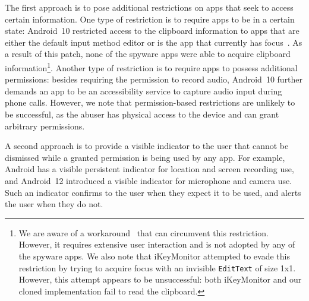 The first approach is to pose additional restrictions on apps that seek to access certain information. One type of restriction is to require apps to be in a certain state: Android~10 restricted access to the clipboard information
to apps that are either the default input
method editor or is the app that currently has focus~\cite{Privacyc52:online}. As a result of this
patch, none of the spyware apps were able to acquire clipboard information\footnote{We are aware of a workaround~\cite{SolvedCl34:online} that can circumvent this restriction. However, it requires extensive user interaction and is not adopted by any of the spyware apps. We also note
that iKeyMonitor
attempted to evade this restriction by trying to acquire focus with an
invisible \texttt{EditText} of size 1x1. However, this attempt appears to be
unsuccessful: both iKeyMonitor and our cloned implementation fail to
read the clipboard.}. Another type of restriction is to require apps to possess additional permissions: besides requiring the permission to record audio, Android~10 further demands an app to be an accessibility service to capture audio input during phone calls. However, we note that permission-based restrictions are unlikely to be successful, as the abuser has physical access to the device and can grant arbitrary permissions.

 






A second approach is to provide a visible indicator to the user that cannot be
dismissed while a granted permission is being used by any app.  For example,
Android has a visible persistent indicator for location and screen recording
use, and Android~12 introduced a visible indicator for microphone and camera
use. Such an indicator confirms to the user when they expect it to be used, and
alerts the user when they do not.

